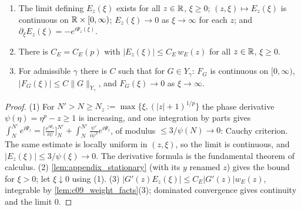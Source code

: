 \begin{lemma}
  \label{lem:c09_tail_basic}
  \begin{enumerate}
    \item The limit defining $E_z(\xi)$ exists for all $z\in\mathbb{R}$, $\xi\ge0$; $(z,\xi)\mapsto E_z(\xi)$ is continuous on $\mathbb{R}\times[0,\infty)$;
      $E_z(\xi)\to0$ as $\xi\to\infty$ for each $z$; and $\partial_\xi E_z(\xi)=-e^{i\Psi_z(\xi)}$.
    \item There is $C_E=C_E(p)$ with $|E_z(\xi)|\le C_E\,w_E(z)$ for all $z\in\mathbb{R}$, $\xi\ge0$.
    \item For admissible $\gamma$ there is $C$ such that for $G\in Y_\gamma$: $F_G$ is continuous on $[0,\infty)$,
      $|F_G(\xi)|\le C\|G\|_{Y_\gamma}$, and $F_G(\xi)\to0$ as $\xi\to\infty$.
  \end{enumerate}
\end{lemma}
\begin{proof}
  (1) For $N'>N\ge N_z:=\max\{\xi,(|z|+1)^{1/p}\}$ the phase derivative $\psi(\eta)=\eta^p-z\ge1$ is increasing, and one
  integration by parts gives $\int_N^{N'}e^{i\Psi_z}=\bigl[\frac{e^{i\Psi_z}}{i\psi}\bigr]_N^{N'}+\int_N^{N'}\frac{\psi'}{i\psi^2}e^{i\Psi_z}$, of modulus
  $\le3/\psi(N)\to0$: Cauchy criterion. The same estimate is locally uniform in $(z,\xi)$, so the limit is continuous,
  and $|E_z(\xi)|\le3/\psi(\xi)\to0$. The derivative formula is the fundamental theorem of calculus.
  (2) \cref{lem:appendix_stationary} (with its $y$ renamed $z$) gives the bound for $\xi>0$; let $\xi\downarrow0$ using (1).
  (3) $|G'(z)E_z(\xi)|\le C_E|G'(z)|w_E(z)$, integrable by \cref{lem:c09_weight_facts}(3); dominated convergence
  gives continuity and the limit $0$.
\end{proof}

